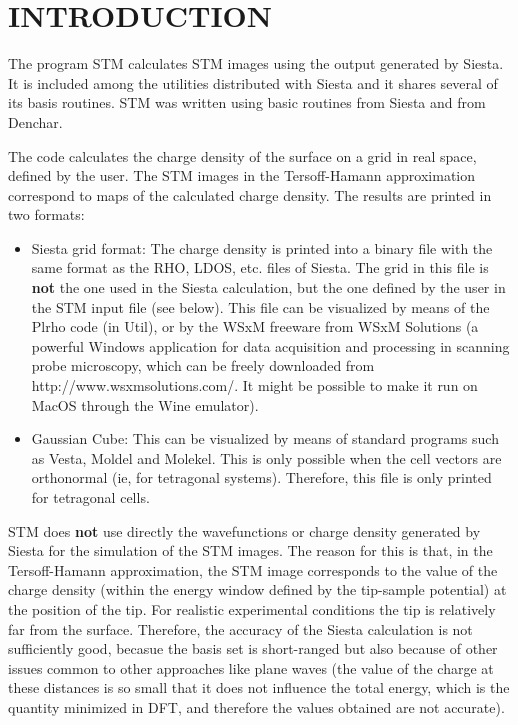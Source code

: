 
\tableofcontents

\newpage



\section{INTRODUCTION}

The program {\sc STM} calculates STM images using the output
generated by {\sc Siesta}.
It is included among the utilities distributed with {\sc Siesta}
and it shares several of its basis routines. 
{\sc STM} was written using basic routines from 
{\sc Siesta} and from {\sc Denchar}.

The code calculates the charge density of the surface
on a grid in real space, defined by the user. The STM images
in the Tersoff-Hamann approximation correspond to maps of
the calculated charge density. 
The results are printed in two formats:

\begin{itemize} 

\item{{\sc Siesta} grid format:}
The charge density is printed into a binary file with the same
format as the RHO, LDOS, etc. files of {\sc Siesta}. The grid
in this file is {\bf not} the one used in the {\sc Siesta}
calculation, but the one defined by the user in the {\sc STM}
input file (see below).
This file can be visualized by means of the {\sc Plrho}
code (in Util), or by the WSxM freeware from WSxM Solutions
(a powerful Windows application for data 
acquisition and processing in scanning probe microscopy,
which can be freely downloaded from http://www.wsxmsolutions.com/. It
might be possible to make it run on MacOS through the Wine emulator).


\item{Gaussian Cube:}
This can be visualized by means of standard programs
such as {\sc Vesta}, {\sc Moldel} and {\sc Molekel}. This is only possible
when the cell vectors are orthonormal (ie, for tetragonal systems).
Therefore, this file is only printed for tetragonal cells.

\end{itemize}

{\sc STM} does {\bf not} use directly the wavefunctions or charge density
generated by {\sc Siesta} for the simulation of the STM images. The
reason for this is that, in the Tersoff-Hamann approximation,
the STM image corresponds to the value of the charge density
(within the energy window defined by the tip-sample potential)
at the position of the tip. For realistic experimental conditions
the tip is relatively far from the surface. Therefore, the accuracy
of the {\sc Siesta} calculation is not sufficiently good, becasue
the basis set is short-ranged but also because of other issues
common to other approaches like plane waves (the value of the charge
at these distances is so small that it does not influence the
total energy, which is the quantity minimized in DFT, and therefore
the values obtained are not accurate).

